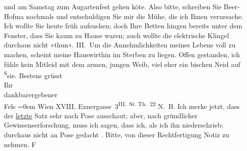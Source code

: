 \begin{ledgroupsized}[t]{13cm}
                    und am Samstag zum Augartenfest
                    gehen kö{\geminationn}te. Also bitte, schreiben Sie Beer-Hofma{\geminationn} nochmals und entschuldigen Sie mir die Mühe, die ich Ihnen verursache. Ich
                    wollte Sie heute früh aufsuchen; doch Ihre Betten hingen bereits {\pb}unter dem Fenster, dass Sie kaum zu Hause waren;
                    auch wollte die elektrische Klingel durchaus nicht »thun«.\pend
           \pstart
           III. Um die Annehmlichkeiten meines Lebens voll zu machen, scheint meine Hauswirthin im Sterben zu
                    liegen. Offen gestanden, ich fühle kein Mitleid mit dem armen, jungen Weib, viel
                    eher ein bischen Neid auf \substVorne{}\textsuperscript{S}\substDazwischen{}s\substHinten{}ie.\pend
           \pstart
           Bestens grüsst{\\[\baselineskip]}Ihr{\\[\baselineskip]}dankbarergebener{\\[\baselineskip]}\spacefill\mbox{Fels}\pend
           \leftskip=0em{}\pstart
           \noindent{}Wien XVIII, Exnergasse 3\textsuperscript{III. St. Th. 22}\pend
           \pstart
           N. B. Ich merke jetzt, dass der \uline{letzte} Satz
                        sehr nach Pose ausschaut; aber, nach gründlicher Gewissenserforschung, muss
                        ich sagen, dass ich, als ich ihn niederschrieb; durchaus nicht an Pose
                        gedacht \label{T_L00326_1v}\label{T_L00326_1h}. Bitte, von dieser
                        Rechtfertigung Notiz zu nehmen. \spacefill\mbox{F}\pend
           \endnumbering{}\end{ledgroupsized}  \newcommand{\dateiname}{L00326}\newcommand{\titel}{Friedrich M. Fels an Arthur Schnitzler, [17. 5. 1894]}\newcommand{\editorInnen}{Martin Anton Müller und Gerd-Hermann Susen}
      